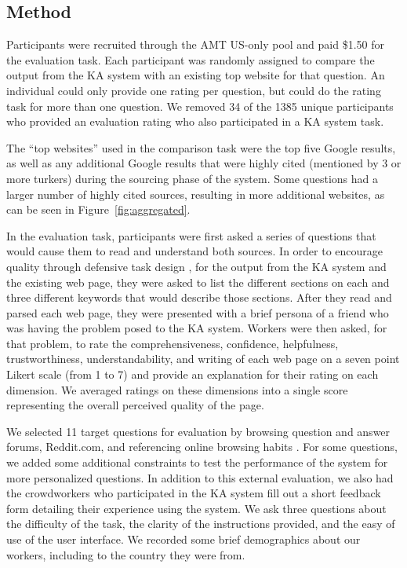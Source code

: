 \subsection{Method}

Participants were recruited through the AMT US-only pool and paid \$1.50 for the evaluation task. Each participant was randomly assigned to compare the output from the KA system with an existing top website for that question. An individual could only provide one rating per question, but could do the rating task for more than one question. We removed 34 of the 1385 unique participants who provided an evaluation rating who also participated in a KA system task.

The ``top websites'' used in the comparison task were the top five Google results, as well as any additional Google results that were highly cited (mentioned by 3 or more turkers) during the sourcing phase of the system. Some questions had a larger number of highly cited sources, resulting in more additional websites, as can be seen in Figure~\ref{fig:aggregated}.

In the evaluation task, participants were first asked a series of questions that would cause them to read and understand both sources. In order to encourage quality through defensive task design \cite{kittur2008crowdsourcing}, for the output from the KA system and the existing web page, they were asked to list the different sections on each and three different keywords that would describe those sections. After they read and parsed each web page, they were presented with a brief persona of a friend who was having the problem posed to the KA system. Workers were then asked, for that problem, to rate the comprehensiveness, confidence, helpfulness, trustworthiness, understandability, and writing of each web page on a seven point Likert scale (from 1 to 7) and provide an explanation for their rating on each dimension. We averaged ratings on these dimensions into a single score representing the overall perceived quality of the page.

We selected 11 target questions for evaluation by browsing question and answer forums, Reddit.com, and referencing online browsing habits \cite{pewReport}. For some questions, we added some additional constraints to test the performance of the system for more personalized questions. In addition to this external evaluation, we also had the crowdworkers who participated in the KA system fill out a short feedback form detailing their experience using the system. We ask three questions about the difficulty of the task, the clarity of the instructions provided, and the easy of use of the user interface. We recorded some brief demographics about our workers, including to the country they were from.

